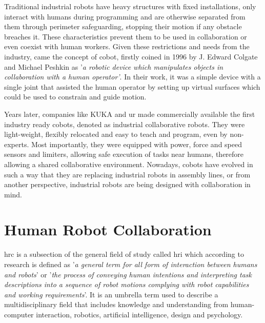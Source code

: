 \par Traditional industrial robots have heavy structures with fixed installations, only interact with humans during programming and are otherwise separated from them through perimeter safeguarding, stopping their motion if any obstacle breaches it. These characteristics prevent them to be used in collaboration or even coexist with human workers. Given these restrictions and needs from the industry, came the concept of \ac{cobot}, firstly coined in 1996 by J. Edward Colgate and Michael Peshkin \cite{cobot.old} as '\textit{a robotic device which manipulates objects in collaboration with a human operator'}. In their work, it was a simple device with a single joint that assisted the human operator by setting up virtual surfaces which could be used to constrain and guide motion.

\par Years later, companies like KUKA and \ac{ur} made commercially available the first industry ready cobots, denoted as industrial collaborative robots. They were light-weight, flexibly relocated and easy to teach and program, even by non-experts. Most importantly, they were equipped with power, force and speed sensors and limiters, allowing safe execution of tasks near humans, therefore allowing a shared collaborative environment. Nowadays, cobots have evolved in such a way that they are replacing industrial robots in assembly lines, or from another perspective, industrial robots are being designed with collaboration in mind.








\section{Human Robot Collaboration}

\par \ac{hrc} is a subsection of the general field of study called \ac{hri} which according to research \cite{hri.1, hri.2} is defined as '\textit{a general term for all form of interaction between humans and robots}' or '\textit{the process of conveying human intentions and interpreting task descriptions into a sequence of robot motions complying with robot capabilities and working requirements}'. It is an umbrella term used to describe a multidisciplinary field that includes knowledge and understanding from human-computer interaction, robotics, artificial intelligence, design and psychology. 

